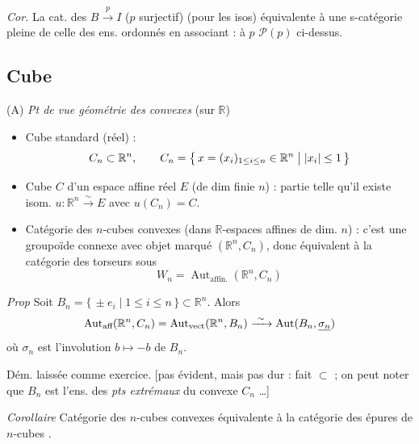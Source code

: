\documentclass[11pt,a4paper]{article}
\begin{document}
\emph{Cor.} La cat. des $B \xrightarrow{p} I$ ($p$ surjectif) (pour les isos)
équivalente à une s-catégorie pleine de celle des ens. ordonnés en associant :
à $p$ \ill{} $\mathcal{P}(p)$ ci-dessus.


\subsection*{Cube}

(A) \emph{Pt de vue géométrie des} \struck{\ill{}} \emph{convexes}
(sur $\mathbb{R}$)

\begin{itemize}
  \item[(a)] Cube standard (réel) :
    \[
      C_n \subset \mathbb{R}^n, \qquad
      C_n = \bigl\{\, x = (x_i)_{1\leq i\leq n} \in \mathbb{R}^n \bigm| |x_i| \leq 1 \,\bigr\}
    \]
  \item[(b)] Cube $C$ d'un  espace affine réel $E$ (de dim
    finie $n$) : partie telle qu'il existe isom.  $u : \mathbb{R}^n
    \xrightarrow{\sim} E$ avec $u(C_n) = C$.
  \item[(c)] Catégorie des $n$-cubes  convexes (dans
     $\mathbb{R}$-espaces affines de dim. $n$) : c'est une
    groupoïde connexe avec objet marqué $(\mathbb{R}^n, C_n)$, donc équivalent à
    la catégorie des torseurs sous
    \[
      W_n = \operatorname{Aut}_{\text{affin.}}(\mathbb{R}^n, C_n)
    \]
\end{itemize}

\emph{Prop} Soit
$B_n = \{\, \pm e_i \mid 1 \leq i \leq n \,\} \subset \mathbb{R}^n$. Alors
\[
  \operatorname{Aut}_{\text{aff}}(\mathbb{R}^n, C_n) = \operatorname{Aut}_{\text{vect}}(\mathbb{R}^n, B_n)
  \xrightarrow{\ \sim\ } \operatorname{Aut}(B_n, \uncertain{\sigma_n})
\]
où $\sigma_n$ est l'involution $b \mapsto -b$ de $B_n$. 

 Dém. laissée comme exercice. [pas évident, mais pas dur : fait
$\subset$ ; on peut noter que $B_n$ est l'ens. des \emph{pts extrémaux} du
convexe $C_n$ …]

\emph{Corollaire} Catégorie des $n$-cubes convexes équivalente à la catégorie
des épures de $n$-cubes
.
\end{document}
